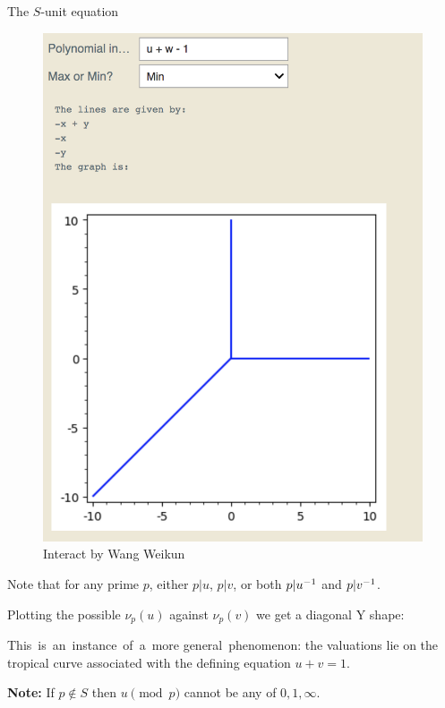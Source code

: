\begin{frame}{The $S$-unit equation}
    \begin{figure}
        \vspace{-25pt}
        \includegraphics[width=\textwidth]{wang2}
        \caption*{Interact by Wang Weikun}
    \end{figure}
    Note that for any prime $p$, either $p|u$, $p|v$, or both $p|u^{-1}$ and $p|v^{-1}$.

    Plotting the possible $\nu_p(u)$ against $\nu_p(v)$ we get a diagonal Y shape:\pause

    This~is~an~instance~of~a~more general~phenomenon: the valuations lie on the tropical curve associated with the defining equation $u+v=1$.

    \textbf{Note:} If $p \not\in S$ then $u\pmod p$ cannot be any of $0, 1, \infty $.

\end{frame}

